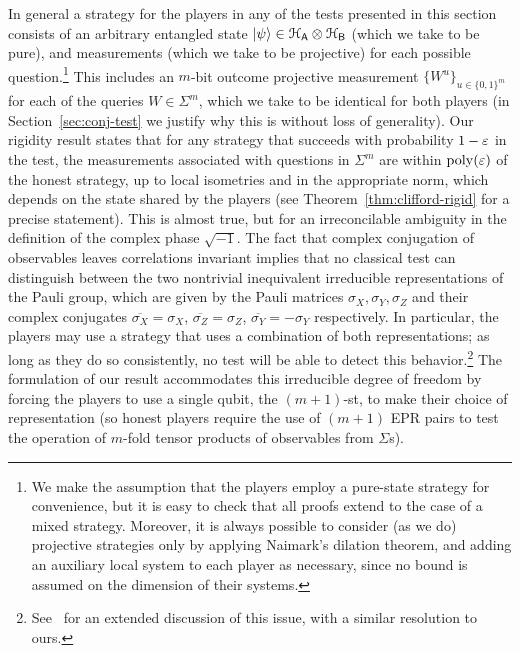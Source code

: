 In general a strategy for the players in any of the tests presented in this section consists of an arbitrary entangled state $|\psi\rangle \in \mathcal{H}_{\textsf{A}} \otimes \mathcal{H}_{\textsf{B}}$ (which we take to be pure), and measurements (which we take to be projective) for each possible question.\footnote{We make the assumption that the players employ a pure-state strategy for convenience, but it is easy to check that all proofs extend to the case of a mixed strategy. Moreover, it is always possible to consider (as we do)  projective strategies only by applying Naimark's dilation theorem, and adding an auxiliary local system to each player as necessary, since no bound is assumed on the dimension of their systems.} This includes an $m$-bit outcome projective measurement $\{W^u\}_{u\in\{0,1\}^{m}}$ for each of the queries $W\in\Sigma^m$, which we take to be identical for both players (in Section~\ref{sec:conj-test} we justify why this is without loss of generality). Our rigidity result states that for any strategy that succeeds with probability $1-\varepsilon$ in the test, the measurements associated with questions in $\Sigma^m$ are within $\operatorname{poly}(\varepsilon)$ of the honest strategy, up to local isometries and in the appropriate norm, which depends on the state shared by the players (see Theorem~\ref{thm:clifford-rigid} for a precise statement). This is almost true, but for an irreconcilable ambiguity in the definition of the complex phase $\sqrt{-1}$. The fact that complex conjugation of observables 
leaves correlations invariant implies that no classical test can distinguish between the two nontrivial inequivalent irreducible representations of the Pauli group, which are given by the Pauli matrices $\sigma_X,\sigma_Y,\sigma_Z$ and their complex conjugates $\overline{\sigma_X}=\sigma_X$, $\overline{\sigma_Z}=\sigma_Z$, $\overline{\sigma_Y}=-\sigma_Y$ respectively. In particular, the players may use a strategy that uses a combination of both representations; as long as they do so consistently, no test will be able to detect this behavior.\footnote{See~\cite[Appendix A]{reichardt2012classicalarxiv} for an extended discussion of this issue, with a similar resolution to ours.}  The formulation of our result accommodates this irreducible degree of freedom by forcing the players to use a single qubit, the $(m+1)$-st, to make their choice of representation (so honest players require the use of $(m+1)$ EPR pairs to test the operation of $m$-fold tensor products of observables from $\Sigma$s). 

